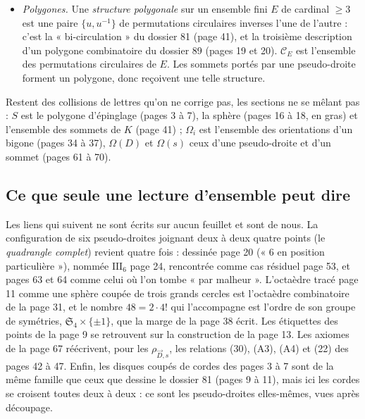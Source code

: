 \documentclass[11pt,a4paper]{article}
\begin{document}
\begin{itemize}
  l'ensemble de ses deux orientations (ordres totaux à permutation paire
  près) ; pour $\operatorname{card} I = 3$, ce sont ses deux ordres
  circulaires, l'ensemble que le dossier 89 note $\omega_I$. On garde le
  signe $\wedge$ des pages, qui est celui du dossier 89.
  \item \emph{Polygones.} Une \emph{structure polygonale} sur un ensemble
  fini $E$ de cardinal $\geqslant 3$ est une paire $\{u, u^{-1}\}$ de
  permutations circulaires inverses l'une de l'autre : c'est la
  « bi-circulation » du dossier 81 (page 41), et la troisième description
  d'un polygone combinatoire du dossier 89 (pages 19 et 20). $\mathcal{C}_E$
  est l'ensemble des permutations circulaires de $E$. Les sommets portés par
  une pseudo-droite forment un polygone, donc reçoivent une telle
  structure.
\end{itemize}

Restent des collisions de lettres qu'on ne corrige pas, les sections ne se
mêlant pas : $S$ est le polygone d'épinglage (pages 3 à 7), la sphère
(pages 16 à 18, en gras) et l'ensemble des sommets de $K$ (page 41) ;
$\Omega_i$ est l'ensemble des orientations d'un bigone (pages 34 à 37),
$\Omega(D)$ et $\Omega(s)$ ceux d'une pseudo-droite et d'un sommet (pages 61
à 70).

\subsection*{Ce que seule une lecture d'ensemble peut dire}

Les liens qui suivent ne sont écrits sur aucun feuillet et sont de nous. La
configuration de six pseudo-droites joignant deux à deux quatre points (le
\emph{quadrangle complet}) revient quatre fois : dessinée page 20 (« $6$
en position particulière »), nommée $\mathrm{III}_6$ page 24, rencontrée
comme cas résiduel page 53, et pages 63 et 64 comme celui où l'on tombe
« par malheur ». L'octaèdre tracé page 11 comme une sphère coupée de trois grands
cercles est l'octaèdre combinatoire de la page 31, et le nombre
$48 = 2 \cdot 4!$ qui l'accompagne est l'ordre de son groupe de symétries,
$\mathfrak{S}_4 \times \{\pm 1\}$, que la marge de la page 38 écrit. Les
étiquettes des points de la page 9 se retrouvent sur la construction de la
page 13. Les axiomes de la page 67 réécrivent, pour les $\rho_{\vec{D},s}$,
les relations (30), (A3), (A4) et (22) des pages 42 à 47. Enfin, les disques
coupés de cordes des pages 3 à 7 sont de la même famille que ceux que
dessine le dossier 81 (pages 9 à 11), mais ici les cordes se croisent toutes
deux à deux : ce sont les pseudo-droites elles-mêmes, vues après découpage.
\end{document}
